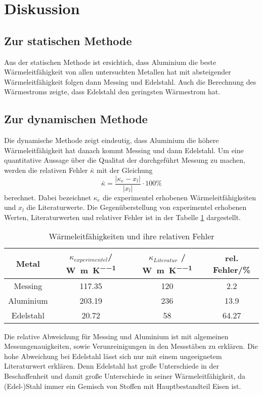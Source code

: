 \section{Diskussion}
\label{sec:Diskussion}
\subsection{Zur statischen Methode}
Aus der statischen Methode ist ersichtich, dass Aluminium die beste
Wärmeleitfähigkeit von allen untersuchten Metallen hat mit absteigender
Wärmeleitfähigkeit folgen dann Messing und Edelstahl. Auch die Berechnung des
Wärmestroms zeigte, dass Edelstahl den geringsten Wärmestrom hat.
\subsection{Zur dynamischen Methode}
Die dynamische Methode zeigt eindeutig, dass Aluminium die höhere
Wärmeleitfähigkeit hat danach kommt Messing und dann Edelstahl.
Um eine quantitative Aussage über die Qualitat der durchgeführt Messung zu
machen, werden die relativen Fehler $\bar{\kappa}$ mit der Gleichung
\begin{equation*}
  \bar{\kappa} = \frac{\lvert \kappa_e - x_l\rvert}{\lvert x_l\rvert} \cdot 100 \%
\end{equation*}
berechnet. Dabei bezeichnet $\kappa_e$ die experimentel erhobenen
Wärmeleitfähigkeiten und $x_l$ die Literaturwerte. Die Gegenüberstellung
von experimentel erhobenen Werten, Literaturwerten und relativer Fehler ist in
der Tabelle \ref{tab:rf} dargestellt.
\begin{table}
  \centering
  \caption{Wärmeleitfähigkeiten und ihre relativen Fehler}
  \begin{tabular}{c c c c}
    \toprule
    Metal & $\kappa_{experimentel}$/ \si{\watt\per\meter\per\kelvin}
    & $\kappa_{Literatur}$ / \si{\watt\per\meter\per\kelvin}
    & rel. Fehler/\si{\percent} \\
    \midrule
      Messing & 117.35 & 120 & 2.2  \\
      Aluminium & 203.19 & 236 & 13.9 \\
      Edelstahl & 20.72 & 58 & 64.27 \\
    \bottomrule
  \end{tabular}
  \label{tab:rf}
\end{table}
\FloatBarrier
Die relative Abweichung für Messing und Aluminium ist mit algemeinen Messungenauigkeiten,
sowie Verunreinigungen in den Messstäben zu erklären. Die hohe Abweichung bei
Edelstahl lässt sich nur mit einem ungeeignetem Literaturwert erklären.
Denn Edelstahl hat große Unterschiede in der Beschaffenheit und damit große
Unterschiede in seiner Wärmeleitfähigkeit, da (Edel-)Stahl immer ein Gemisch von
Stoffen mit Hauptbestandteil Eisen ist.
